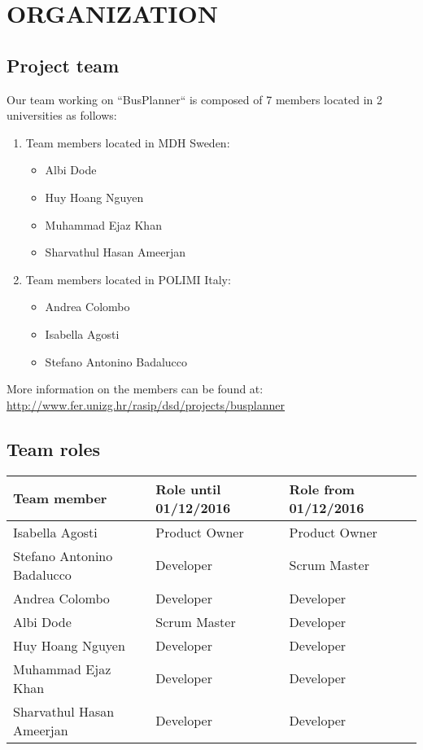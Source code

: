 \section{ORGANIZATION}
\subsection{Project team}
Our team working on “BusPlanner“ is composed of 7 members located in 2 universities as follows:
\begin{enumerate}
	\item Team members located in MDH Sweden:
	\begin{itemize}
		\item Albi Dode
		\item Huy Hoang Nguyen
		\item Muhammad Ejaz Khan
		\item Sharvathul Hasan Ameerjan	
	\end{itemize}
	\item Team members located in POLIMI Italy:
	\begin{itemize}
		\item Andrea Colombo
		\item Isabella Agosti
		\item Stefano Antonino Badalucco	
	\end{itemize}
\end{enumerate}
More information on the members can be found at: \\
\url{http://www.fer.unizg.hr/rasip/dsd/projects/busplanner}

\subsection{Team roles}
\begin{table}[h]
	\centering
	\begin{tabular}{| m{5.2cm} | m{3.4cm} | m{3.4cm} |}
		\hline
		\textbf{Team member} & \textbf{Role until 01/12/2016} & \textbf{Role from 01/12/2016}\\
		\hline
		Isabella Agosti & Product Owner & Product Owner \\
		\hline
		Stefano Antonino Badalucco & Developer & Scrum Master \\
		\hline
		Andrea Colombo & Developer & Developer \\
		\hline
		Albi Dode & Scrum Master & Developer \\
		\hline
		Huy Hoang Nguyen & Developer & Developer \\
		\hline
		Muhammad Ejaz Khan & Developer & Developer \\
		\hline
		Sharvathul Hasan Ameerjan & Developer & Developer \\
		\hline
	\end{tabular}
\end{table}
\newpage
